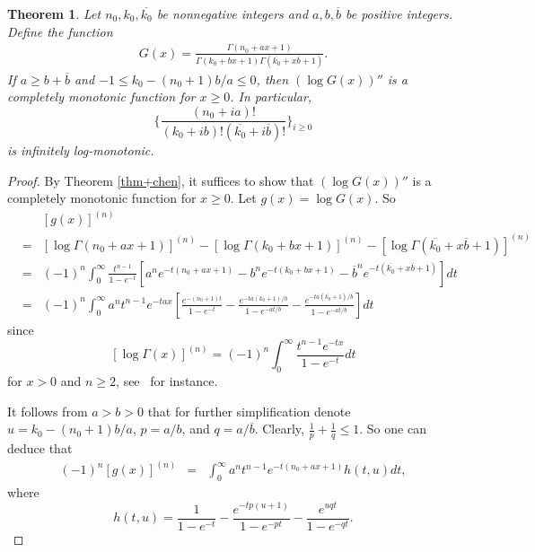 \documentclass[12pt,reqno]{article}
\newtheorem{thm}{Theorem}[section]
\theoremstyle{definition}
\numberwithin{equation}{section}
\begin{document}
\begin{thm}\label{thm+e}
Let $n_{0},k_{0},\overline{k_0}$ be nonnegative integers and
$a,b,\overline{b}$ be positive integers. Define the function
\begin{eqnarray*}
G(x)=\frac{\Gamma(n_{0}+ax+1)}{{\Gamma(k_{0}+bx+1)}
{\Gamma(\overline{k_{0}}+x\overline{b}+1)}}.
\end{eqnarray*}
If $a\geq b+\overline{b}$ and $-1\leq k_0-(n_0+1)b/a\leq0$, then
$(\log G(x))''$ is a completely monotonic function for $x\geq0$. In
particular,
$$\{\frac{(n_{0}+ia)!}{(k_0+ib)!(\overline{k_0}+i\overline{b})!}\}_{i\geq0}$$
is infinitely log-monotonic.
\end{thm}
\begin{proof}
By Theorem \ref{thm+chen}, it suffices to show that $(\log G(x))''$
is a completely monotonic function for $x\geq0$. Let $ g(x)=\log
G(x).$ So
\begin{eqnarray}\label{eq}
&&[g(x)]^{(n)}\nonumber\\
&=&[\log\Gamma(n_{0}+ax+1)]^{(n)}-[\log{\Gamma(k_{0}+bx+1)}]^{(n)}-[\log{\Gamma(\overline{k_{0}}+x\overline{b}+1)}]^{(n)}\nonumber\\
&=&(-1)^n\int_{0}^{\infty}\frac{t^{n-1}}{1-e^{-t}}\left[a^ne^{-t(n_{0}+ax+1)}-b^ne^{-t(k_{0}+bx+1)}-\overline{b}^ne^{-t(\overline{k_{0}}+x\overline{b}+1)}\right]dt\\
&=&(-1)^n\int_{0}^{\infty}a^nt^{n-1}e^{-tax}\left[\frac{e^{-(n_0+1)t}}{1-e^{-t}}-\frac{e^{-ta(k_{0}+1)/b}}{1-e^{-at/b}}-\frac{e^{-ta(\overline{k_{0}}+1)/\overline{b}}}{1-e^{-at/\overline{b}}}\right]dt\nonumber
\end{eqnarray}
since
$$[\log\Gamma(x)]^{(n)}=(-1)^{n}\int_{0}^{\infty}\frac{t^{n-1}e^{-tx}}{1-e^{-t}}dt$$ for
$x>0$ and $n\geq2$, see~\cite[p.16]{MOS66} for instance.



It follows from $a>b>0$ that for further simplification denote
$u=k_0-(n_0+1)b/a$, $p=a/b$, and $q=a/\overline{b}$. Clearly,
$\frac{1}{p}+\frac{1}{q}\leq1$. So one can deduce that
\begin{eqnarray}\label{eqq}
(-1)^n[g(x)]^{(n)}
&=&\int_{0}^{\infty}a^nt^{n-1}e^{-t(n_{0}+ax+1)}h(t,u)dt,
\end{eqnarray}
where
$$h(t,u)=\frac{1}{1-e^{-t}}-\frac{e^{-tp(u+1)}}{1-e^{-pt}}-\frac{e^{uqt}}{1-e^{-qt}}.$$



\end{proof}
\end{document}
